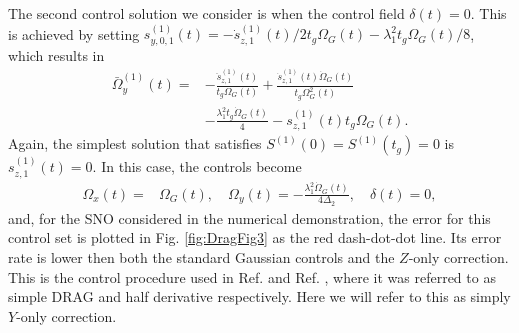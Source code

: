 \documentclass[pra,twocolumn,floatfix,superscriptaddress,eqsecnum]{revtex4-1}
\begin{document}
The second control solution we consider is when the control field $\delta(t)=0$. This is achieved by setting $s^{(1)}_{y,0,1}(t)=-\dot{s}^{(1)}_{z,1}(t)/2t_g\Omega_G(t) -{\lambda_1^2 t_g\Omega_G(t)}/{8}$, which results in
\begin{equation}
\begin{split}
 \bar\Omega_{y}^{(1)}(t) =& -\frac{\ddot{s}^{(1)}_{z,1}(t)}{t_g\Omega_G(t)}+\frac{\dot{s}^{(1)}_{z,1}(t)\dot\Omega_G(t)}{t_g\Omega^2_G(t)}\\&  -\frac{\lambda_1^2 t_g\dot\Omega_G(t)}{4}-s^{(1)}_{z,1} (t)t_g\Omega_G (t).
  \end{split}
\end{equation} Again, the simplest solution that satisfies $S^{(1)}(0)=S^{(1)}(t_g)=0$ is $s^{(1)}_{z,1}(t)=0$. In this case, the controls become
\begin{equation}
\begin{split}
\Omega_{x}(t) = &  \Omega_G(t) ,\quad
\Omega_{y}(t) =  -\frac{\lambda_1^2 \dot\Omega_G(t)}{4\Delta_2},\quad
\delta(t) =  0,
  \end{split}
\end{equation} and, for the SNO considered in the numerical demonstration, the error for this control set is plotted in Fig. \ref{fig:DragFig3} as the red dash-dot-dot line. Its error rate is lower then both the standard Gaussian controls and the $Z$-only correction. This is the control procedure used in Ref. \cite{Chow2010a} and Ref. \cite{Lucero2010}, where it was referred to as simple DRAG and half derivative respectively. Here we will refer to this as simply $Y$-only correction.
\end{document}
